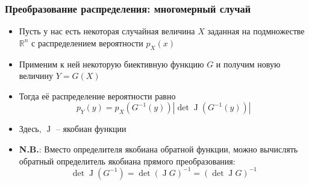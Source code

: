 \documentclass[10pt]{beamer}
\begin{document}
\begin{frame}[fragile]
\frametitle{Преобразование распределения: многомерный случай}
\begin{itemize}
\item Пусть у нас есть некоторая случайная величина \begin{math}X\end{math} заданная на подмножестве \begin{math}\mathbb R^n\end{math} с распределением вероятности \begin{math}p_X(x)\end{math}
\pause
\item Применим к ней некоторую биективную функцию \begin{math}G\end{math} и получим новую величину \begin{math}Y = G(X)\end{math}
\pause
\item Тогда её распределение вероятности равно
\begin{equation*}
p_Y(y) = p_X(G^{-1}(y))\left|\det \operatorname J(G^{-1}(y))\right|
\end{equation*}
\pause
\item Здесь, \begin{math}\operatorname J\end{math} -- якобиан функции
\pause
\item \alert{\textbf{N.B.}}: Вместо определителя якобиана обратной функции, можно вычислять обратный определитель якобиана прямого преобразования:
\begin{equation*}
\det \operatorname J (G^{-1}) = \det \left(\operatorname J G\right)^{-1} = \left(\det \operatorname J G\right)^{-1}
\end{equation*}
\end{itemize}
\end{frame}
\end{document}
